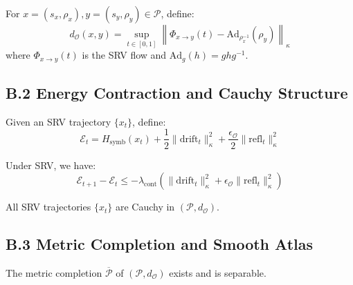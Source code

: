 \begin{definition}
\label{definition:appB_observer_metric}
For $x = (s_x, \rho_x), y = (s_y, \rho_y) \in \mathcal{P}$, define:
\[
d_{\mathcal{O}}(x,y) = \sup_{t \in [0,1]} \left\| \Phi_{x \to y}(t) - \text{Ad}_{\rho_x^{-1}}(\rho_y) \right\|_{\kappa}
\]
where $\Phi_{x \to y}(t)$ is the SRV flow and $\text{Ad}_g(h) = g h g^{-1}$.
\end{definition}

\subsection*{B.2 Energy Contraction and Cauchy Structure}
\label{subsec:appB_cauchy}

\begin{definition}
\label{definition:appB_symbolic_energy}
Given an SRV trajectory $\{x_t\}$, define:
\[
\mathcal{E}_t = H_{\text{symb}}(x_t) + \frac{1}{2}\|\text{drift}_t\|_\kappa^2 + \frac{\epsilon_{\mathcal{O}}}{2}\|\text{refl}_t\|_\kappa^2
\]
\end{definition}

\begin{lemma}
\label{lemma:appB_energy_contraction}
Under SRV, we have:
\[
\mathcal{E}_{t+1} - \mathcal{E}_t \leq -\lambda_{\text{cont}} \left( \|\text{drift}_t\|_\kappa^2 + \epsilon_{\mathcal{O}}\|\text{refl}_t\|_\kappa^2 \right)
\]
\end{lemma}

\begin{theorem}
\label{theorem:appB_srv_cauchy}
All SRV trajectories $\{x_t\}$ are Cauchy in $(\mathcal{P}, d_{\mathcal{O}})$.
\end{theorem}

\subsection*{B.3 Metric Completion and Smooth Atlas}
\label{subsec:appB_smooth_completion}

\begin{theorem}
\label{theorem:appB_metric_completion}
The metric completion $\overline{\mathcal{P}}$ of $(\mathcal{P}, d_{\mathcal{O}})$ exists and is separable.
\end{theorem}

